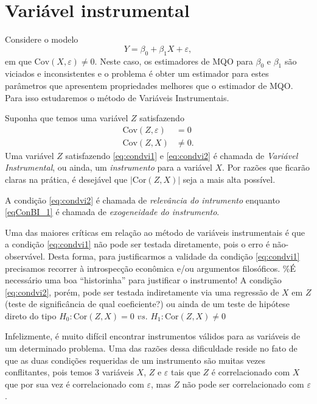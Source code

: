 \documentclass[
]{book}
\theoremstyle{definition}
\theoremstyle{definition}
\theoremstyle{definition}
\theoremstyle{remark}
\begin{document}
\hypertarget{variuxe1vel-instrumental}{%
\section{Variável instrumental}\label{variuxe1vel-instrumental}}

Considere o modelo
\begin{equation}
Y=\beta_0+\beta_1X + \varepsilon,
\label{eq:modvi}
\end{equation}
em que \(\mbox{Cov}(X,\varepsilon)\neq 0\). Neste caso, os estimadores de MQO para \(\beta_0\) e \(\beta_1\) são viciados e inconsistentes e o problema é obter um estimador para estes parâmetros que apresentem propriedades melhores que o estimador de MQO. Para isso estudaremos o método de Variáveis Instrumentais.

Suponha que temos uma variável \(Z\) satisfazendo
\begin{align}
\mbox{Cov}(Z,\varepsilon)&=0 \label{eq:condvi1}\\
\mbox{Cov}(Z,X)&\neq 0. \label{eq:condvi2}
\end{align}
Uma variável \(Z\) satisfazendo \eqref{eq:condvi1} e \eqref{eq:condvi2} é chamada de \emph{Variável Instrumental}, ou ainda, um \emph{instrumento} para a variável \(X\). Por razões que ficarão claras na prática, é desejável que \(|\mbox{Cor}(Z,X)|\) seja a mais alta possível.

A condição \eqref{eq:condvi2} é chamada de \emph{relevância do intrumento} enquanto \eqref{eqConBI_1} é chamada de \emph{exogeneidade do instrumento}.

Uma das maiores críticas em relação ao método de variáveis instrumentais é que a condição \eqref{eq:condvi1} não pode ser testada diretamente, pois o erro é não-observável. Desta forma, para justificarmos a validade da condição \eqref{eq:condvi1} precisamos recorrer à introspecção econômica e/ou argumentos filosóficos.
\%É necessário uma boa ``historinha'' para justificar o instrumento!
A condição \eqref{eq:condvi2}, porém, pode ser testada indiretamente via uma regressão de \(X\) em \(Z\) (teste de significância de qual coeficiente?) ou ainda de um teste de hipótese direto do tipo \(H_0:\mbox{Cor}(Z,X)=0 \, \, vs. \, \, H_1:\mbox{Cor}(Z,X)\neq 0\)

Infelizmente, é muito difícil encontrar instrumentos válidos para as variáveis de um determinado problema. Uma das razões dessa dificuldade reside no fato de que as duas condições requeridas de um instrumento são muitas vezes conflitantes, pois temos 3 variáveis \(X\), \(Z\) e \(\varepsilon\) tais que \(Z\) é correlacionado com \(X\) que por sua vez é correlacionado com \(\varepsilon\), mas \(Z\) não pode ser correlacionado com \(\varepsilon\).
\end{document}
